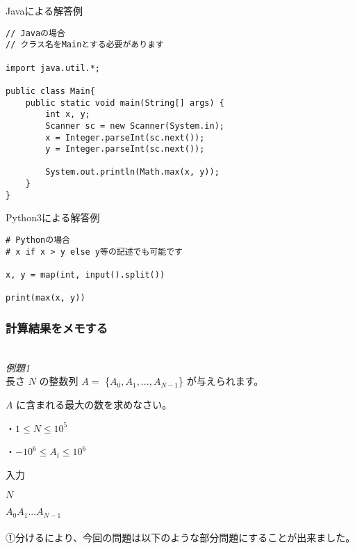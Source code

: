 \noindent
Javaによる解答例
\begin{lstlisting}[style = customJava]
// Javaの場合
// クラス名をMainとする必要があります

import java.util.*;

public class Main{
    public static void main(String[] args) {
        int x, y;
        Scanner sc = new Scanner(System.in);
        x = Integer.parseInt(sc.next());
        y = Integer.parseInt(sc.next());

        System.out.println(Math.max(x, y));
    }
}
\end{lstlisting}

\noindent
Python3による解答例
\begin{lstlisting}[style = customPy]
# Pythonの場合
# x if x > y else y等の記述でも可能です

x, y = map(int, input().split())

print(max(x, y))
\end{lstlisting}

\clearpage

\subsubsection{計算結果をメモする}
\hrulefill \\
\emph{例題1} \\
長さ $N$ の整数列 $A=$ \{$A_0,A_1,...,A_{N-1}$\} が与えられます。

\noindent
$A$ に含まれる最大の数を求めなさい。

\noindent
・$1 \leq N \leq 10^5$

\noindent
・$-10^6 \leq A_i \leq 10^6$

\noindent
入力

\noindent
$N$

\noindent
$A_0 A_1 ... A_{N-1}$\\
\hrulefill \\
\noindent
①分けるにより、今回の問題は以下のような部分問題にすることが出来ました。

